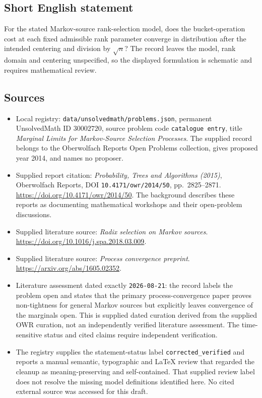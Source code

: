 \documentclass[11pt]{article}
\begin{document}
\subsection{Short English statement}
For the stated Markov-source rank-selection model, does the bucket-operation cost at each fixed admissible rank parameter converge in distribution after the intended centering and division by \(\sqrt n\)? The record leaves the model, rank domain and centering unspecified, so the displayed formulation is schematic and requires mathematical review.
\subsection{Sources}
\begin{itemize}
\item Local registry: \texttt{data/unsolvedmath/problems.json}, permanent UnsolvedMath ID \(30002720\), source problem code \texttt{catalogue entry}, title \emph{Marginal Limits for Markov-Source Selection Processes}. The supplied record belongs to the Oberwolfach Reports Open Problems collection, gives proposed year 2014, and names no proposer.
\item Supplied report citation: \emph{Probability, Trees and Algorithms (2015)}, Oberwolfach Reports, DOI \texttt{10.4171/owr/2014/50}, pp.\ 2825--2871. \url{https://doi.org/10.4171/owr/2014/50}. The background describes these reports as documenting mathematical workshops and their open-problem discussions.
\item Supplied literature source: \emph{Radix selection on Markov sources}. \url{https://doi.org/10.1016/j.spa.2018.03.009}.
\item Supplied literature source: \emph{Process convergence preprint}. \url{https://arxiv.org/abs/1605.02352}.
\item Literature assessment dated exactly \texttt{2026-08-21}: the record labels the problem open and states that the primary process-convergence paper proves non-tightness for general Markov sources but explicitly leaves convergence of the marginals open. This is supplied dated curation derived from the supplied OWR curation, not an independently verified literature assessment. The time-sensitive status and cited claims require independent verification.
\item The registry supplies the statement-status label \texttt{corrected\_verified} and reports a manual semantic, typographic and LaTeX review that regarded the cleanup as meaning-preserving and self-contained. That supplied review label does not resolve the missing model definitions identified here. No cited external source was accessed for this draft.
\end{itemize}
\end{document}
